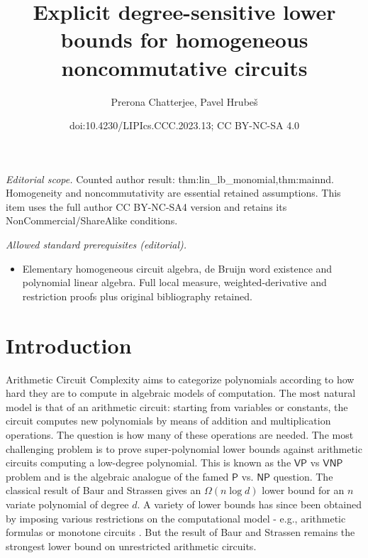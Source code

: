 \documentclass[10pt,a4paper]{article}
\title{Explicit degree-sensitive lower bounds for homogeneous noncommutative circuits}
\author{Prerona Chatterjee, Pavel Hrubeš}
\date{doi:10.4230/LIPIcs.CCC.2023.13; CC BY-NC-SA 4.0}
\def\VP{\mathsf{VP}}
\def\VNP{\mathsf{VNP}}
\def\P{\mathsf{P}}
\def\NP{\mathsf{NP}}
\newcommand{\an}[1]{\textcolor{red}{#1}}
\begin{document}
\maketitle
\noindent\textit{Editorial scope.} Counted author result: thm:lin\_lb\_monomial,thm:mainnd. Homogeneity and noncommutativity are essential retained assumptions. This item uses the full author CC BY-NC-SA4 version and retains its NonCommercial/ShareAlike conditions.\par\medskip
\noindent\textit{Allowed standard prerequisites (editorial).}\begin{itemize}
\item Elementary homogeneous circuit algebra, de Bruijn word existence and polynomial linear algebra. Full local measure, weighted-derivative and restriction proofs plus original bibliography retained.
\end{itemize}\medskip
\section{Introduction}


Arithmetic Circuit Complexity aims to categorize  polynomials according to how hard they are to compute in  algebraic models of computation.
The most natural model is that of an arithmetic circuit: starting from variables or constants, the circuit computes new polynomials by means of addition and multiplication operations. 
The question is how many of these operations are needed. The most challenging problem is to prove super-polynomial lower bounds against arithmetic circuits computing a low-degree polynomial.
This is known as the $\VP$ vs $\VNP$ problem and is the algebraic analogue of the famed $\P$ vs. $\NP$ question.  
The classical result of Baur and Strassen \cite{Str73, BS83} gives an $\Omega(n\log d)$ lower bound for an $n$ variate polynomial of degree $d$. 
A variety of lower bounds has since been obtained by imposing various restrictions on the computational model - e.g., arithmetic formulas or monotone circuits \cite{Kal85, Val80}. 
But the result of Baur and Strassen remains the strongest lower bound on unrestricted arithmetic circuits. 
\end{document}
